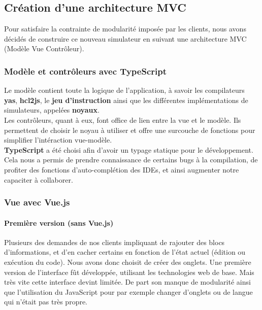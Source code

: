 \documentclass[french]{article}
\begin{document}
\subsection{Création d'une architecture MVC}

Pour satisfaire la contrainte de modularité imposée par les clients, nous avons décidés de construire ce nouveau simulateur en suivant une architecture MVC (Modèle Vue Contrôleur).

\subsubsection{Modèle et contrôleurs avec TypeScript}

Le modèle contient toute la logique de l'application, à savoir les compilateurs \textbf{yas}, \textbf{hcl2js}, le \textbf{jeu d'instruction} ainsi que les différentes implémentations de simulateurs, appelées \textbf{noyaux}.\\

Les contrôleurs, quant à eux, font office de lien entre la vue et le modèle. Ils permettent de choisir le noyau à utiliser et offre une surcouche de fonctions pour simplifier l'intéraction vue-modèle.\\

\textbf{TypeScript} a été choisi afin d'avoir un typage statique pour le développement. Cela nous a permis de prendre connaissance de certains bugs à la compilation, de profiter des fonctions d'auto-complétion des IDEs, et ainsi augmenter notre capaciter à collaborer.

\subsubsection{Vue avec Vue.js}

\paragraph{Première version (sans Vue.js)}

Plusieurs des demandes de nos clients impliquant de rajouter des blocs d'informations, et d'en cacher certains en fonction de l'état actuel (édition ou exécution du code). Nous avons donc choisit de créer des onglets. Une première version de l'interface fût développée, utilisant les technologies web de base. Mais très vite cette interface devint limitée. De part son manque de modularité ainsi que l'utilisation du JavaScript pour par exemple changer d'onglets ou de langue qui n'était pas très propre.
\end{document}
